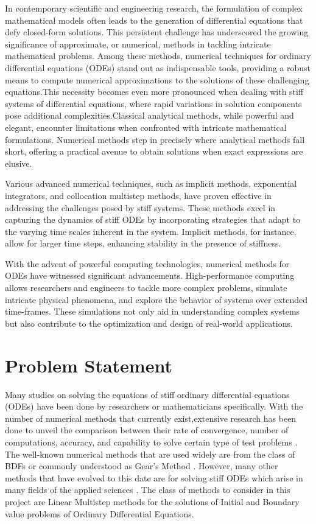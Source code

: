 In contemporary scientific and engineering research, the formulation of complex mathematical models often leads to the generation of differential equations that defy closed-form solutions. This persistent challenge has underscored the growing significance of approximate, or numerical, methods in tackling intricate mathematical problems. Among these methods, numerical techniques for ordinary differential equations (ODEs) stand out as indispensable tools, providing a robust means to compute numerical approximations to the solutions of these challenging equations.This necessity becomes even more pronounced when dealing with stiff systems of differential equations, where rapid variations in solution components pose additional complexities.Classical analytical methods, while powerful and elegant, encounter limitations when confronted with intricate mathematical formulations. Numerical methods step in precisely where analytical methods fall short, offering a practical avenue to obtain solutions when exact expressions are elusive.

Various advanced numerical techniques, such as implicit methods, exponential integrators, and collocation multistep methods, have proven effective in addressing the challenges posed by stiff systems. These methods excel in capturing the dynamics of stiff ODEs by incorporating strategies that adapt to the varying time scales inherent in the system. Implicit methods, for instance, allow for larger time steps, enhancing stability in the presence of stiffness.

With the advent of powerful computing technologies, numerical methods for ODEs have witnessed significant advancements. High-performance computing allows researchers and engineers to tackle more complex problems, simulate intricate physical phenomena, and explore the behavior of systems over extended time-frames. These simulations not only aid in understanding complex systems but also contribute to the optimization and design of real-world applications.

\section{Problem Statement}

Many studies on solving the equations of stiff ordinary differential equations (ODEs) have been done by researchers or mathematicians specifically. With the number of numerical methods that currently exist,extensive research has been done to unveil the comparison between their rate of convergence, number of computations, accuracy, and capability to solve certain type of test problems \cite{Enright1975} . The well-known numerical methods that are used widely are from the class of BDFs or commonly understood as Gear’s Method \cite{BYRNE1977125}.
However, many other methods that have evolved to this date are for solving stiff ODEs which arise in many fields of the applied sciences \cite{Yatim2013}. The class of methods to consider in this project are Linear Multistep methods for the solutions of Initial and Boundary value problems of Ordinary Differential Equations.

